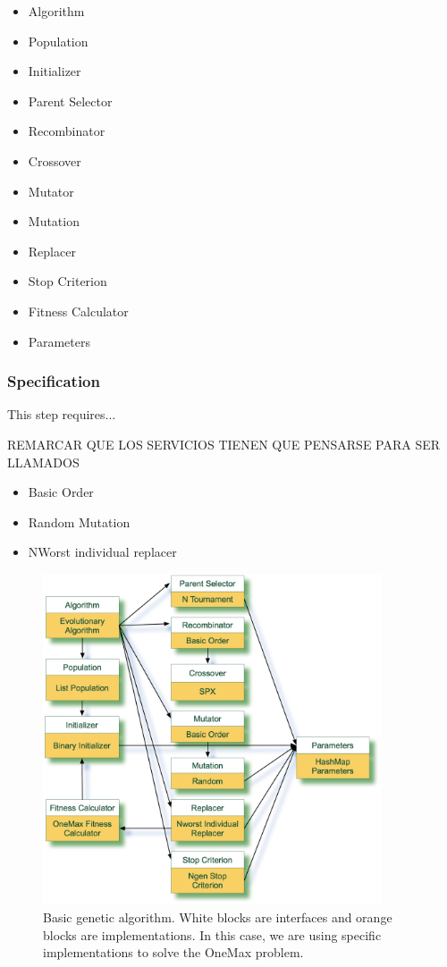 \begin{itemize}
\item Algorithm
\item Population
\item Initializer
\item Parent Selector
\item Recombinator
\item Crossover
\item Mutator
\item Mutation
\item Replacer
\item Stop Criterion
\item Fitness Calculator
\item Parameters
\end{itemize}

\subsubsection{Specification}

This step requires...


REMARCAR QUE LOS SERVICIOS TIENEN QUE PENSARSE PARA SER LLAMADOS

\begin{itemize}
\item Basic Order
\item Random Mutation
\item NWorst individual replacer
\end{itemize}

\begin{figure}
\centering
\includegraphics[width=10cm]{gfx/soaea/basicga.jpg}
\caption{Basic genetic algorithm. White blocks are interfaces and orange blocks are implementations. In this case, we are using specific implementations to solve the OneMax problem.}
\label{BASICGAEXAMPLE}
\end{figure}





